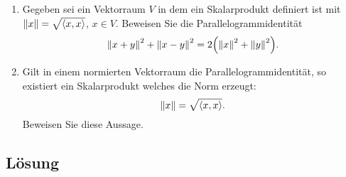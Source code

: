\documentclass[german,12pt]{homework}
\newcommand{\dotproduct}[2]{\left\langle#1, #2\right\rangle}
\DeclarePairedDelimiter{\norm}{\lVert}{\rVert}
\DeclarePairedDelimiter{\enbrace}{(}{)}
\begin{document}
    \begin{problem}
        \begin{enumerate}
            \item Gegeben sei ein Vektorraum \(V\) in dem ein Skalarprodukt definiert ist mit \(\norm*{x} = \sqrt{\dotproduct{x}{x}}\), \(x \in V\). Beweisen Sie die Parallelogrammidentität
            \[\norm*{x + y}^2 + \norm*{x - y}^2 = 2\enbrace*{\norm*{x}^2 + \norm*{y}^2}.\]
            \item Gilt in einem normierten Vektorraum die Parallelogrammidentität, so existiert ein Skalarprodukt welches die Norm erzeugt:
            \[\norm*{x} = \sqrt{\dotproduct{x}{x}}.\]
            Beweisen Sie diese Aussage.
        \end{enumerate}
    \end{problem}

    \subsection*{Lösung}
\end{document}
